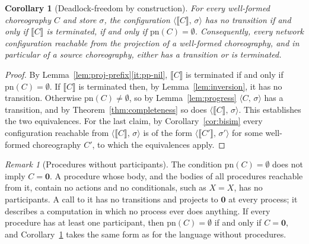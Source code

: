 \documentclass[11pt]{article}
\theoremstyle{plain}
\newtheorem{corollary}[theorem]{Corollary}
\theoremstyle{definition}
\theoremstyle{remark}
\newtheorem{remark}[theorem]{Remark}
\newcommand{\nil}{\mathbf{0}}
\newcommand{\pn}{\mathrm{pn}}
\newcommand{\conf}[2]{\langle #1,\, #2\rangle}
\newcommand{\projn}[1]{\llbracket #1 \rrbracket}
\begin{document}
\begin{corollary}[Deadlock-freedom by construction]\label{cor:df}
  For every well-formed choreography $C$ and store $\sigma$, the
  configuration $\conf{\projn{C}}{\sigma}$ has no transition if and only if
  $\projn{C}$ is terminated, if and only if $\pn(C) = \emptyset$.
  Consequently, every network configuration reachable from the projection of
  a well-formed choreography, and in particular of a source choreography,
  either has a transition or is terminated.
\end{corollary}
\begin{proof}
  By Lemma~\ref{lem:proj-prefix}\ref{it:pp-nil}, $\projn{C}$ is terminated
  if and only if $\pn(C) = \emptyset$.  If $\projn{C}$ is terminated then, by
  Lemma~\ref{lem:inversion}, it has no transition.  Otherwise
  $\pn(C)\neq\emptyset$, so by Lemma~\ref{lem:progress} $\conf{C}{\sigma}$
  has a transition, and by Theorem~\ref{thm:completeness} so does
  $\conf{\projn{C}}{\sigma}$.  This establishes the two equivalences.  For
  the last claim, by Corollary~\ref{cor:bisim} every configuration reachable
  from $\conf{\projn{C}}{\sigma}$ is of the form $\conf{\projn{C'}}{\sigma'}$
  for some well-formed choreography $C'$, to which the equivalences apply.
\end{proof}

\begin{remark}[Procedures without participants]\label{rem:empty}
  The condition $\pn(C) = \emptyset$ does not imply $C = \nil$.  A procedure
  whose body, and the bodies of all procedures reachable from it, contain no
  actions and no conditionals, such as $X = X$, has no participants.  A call
  to it has no transitions and projects to $\nil$ at every process; it
  describes a computation in which no process ever does anything.  If every
  procedure has at least one participant, then $\pn(C) = \emptyset$ if and
  only if $C = \nil$, and Corollary~\ref{cor:df} takes the same form as for
  the language without procedures.
\end{remark}
\end{document}
